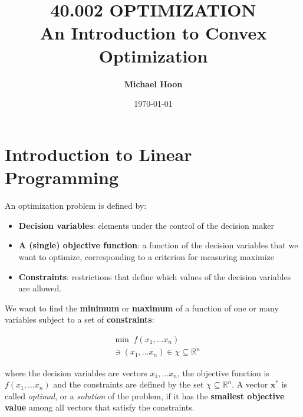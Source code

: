 \documentclass{article}
\begin{document}

\title{ \normalsize \textsc{}
		\\ [2.0cm]
		\HRule{1.5pt} \\
		\LARGE \textbf{\uppercase{40.002 Optimization}
		\HRule{2.0pt} \\ [0.6cm] \LARGE{An Introduction to Convex Optimization} \vspace*{10\baselineskip}}
		}
\date{\today}
\author{\textbf{Michael Hoon}}

\maketitle
\newpage

\tableofcontents
\newpage


\section{Introduction to Linear Programming}
An optimization problem is defined by:

\begin{itemize}
    \item \textbf{Decision variables}: elements under the control of the decision maker
    \item \textbf{A (single) objective function}: a function of the decision variables that we want to optimize, corresponding to a criterion for measuring maximize
    \item \textbf{Constraints}: restrictions that define which values of the decision variables are allowed.
\end{itemize}

\noindent We want to find the \textbf{minimum} or \textbf{maximum} of a function of one or many variables subject to a set of \textbf{constraints}:

\begin{align}
    & \min \; f(x_{1}, \dots x_n) \\ \nonumber
    & \ni(x_{1}, \dots x_n) \in \chi \subseteq \mathbb{R}^{n}
\end{align}

\noindent where the decision variables are vectors $x_{1}, \dots x_n$, the objective function is $f(x_{1}, \dots x_n)$ and the constraints are defined by the set $\chi \subseteq \mathbb{R}^{n}$. A vector $\mathbf{x}^{*}$ is called \textit{optimal}, or a \textit{solution} of the problem, if it has the \textbf{smallest objective value} among all vectors that satisfy the constraints. 
\end{document}
